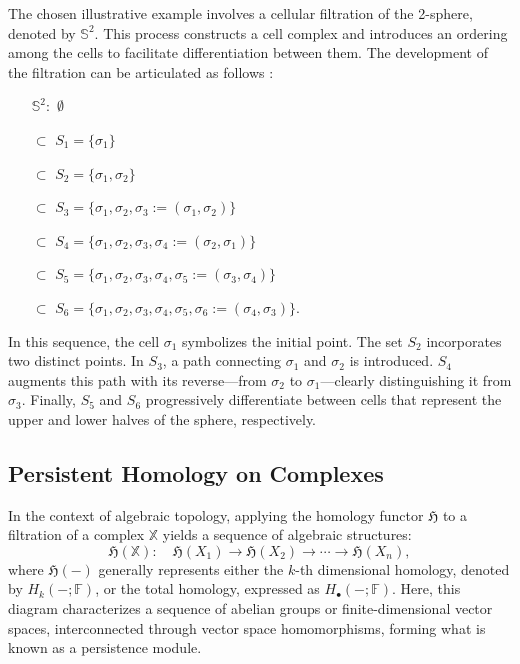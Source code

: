 \begin{example}
\label{filteredsphere}
The chosen illustrative example involves a cellular filtration of the 2-sphere, denoted by \( \mathbb{S}^2 \). This process constructs a cell complex and introduces an ordering among the cells to facilitate differentiation between them. The development of the filtration can be articulated as follows \cite[§2.2]{de2011dualities}:

\begin{itemize}
    \item[\( \mathbb{S}^2:\)] \( \emptyset \)
    \item[\( \subset \)] \( S_1 = \{\sigma_1\} \)
    \item[\( \subset \)] \( S_2 = \{\sigma_1, \sigma_2\} \)
    \item[\( \subset \)] \( S_3 = \{\sigma_1, \sigma_2, \sigma_3 := (\sigma_1, \sigma_2)\} \)
    \item[\( \subset \)] \( S_4 = \{\sigma_1, \sigma_2, \sigma_3, \sigma_4 := (\sigma_2, \sigma_1)\} \)
    \item[\( \subset \)] \( S_5 = \{\sigma_1, \sigma_2, \sigma_3, \sigma_4, \sigma_5 := (\sigma_3, \sigma_4)\} \)
    \item[\( \subset \)] \( S_6 = \{\sigma_1, \sigma_2, \sigma_3, \sigma_4, \sigma_5, \sigma_6 := (\sigma_4, \sigma_3)\}. \)
\end{itemize}

In this sequence, the cell \( \sigma_1 \) symbolizes the initial point. The set \( S_2 \) incorporates two distinct points. In \( S_3 \), a path connecting \( \sigma_1 \) and \( \sigma_2 \) is introduced. \( S_4 \) augments this path with its reverse—from \( \sigma_2 \) to \( \sigma_1 \)—clearly distinguishing it from \( \sigma_3 \). Finally, \( S_5 \) and \( S_6 \) progressively differentiate between cells that represent the upper and lower halves of the sphere, respectively.
\end{example}

\subsection{Persistent Homology on Complexes}
In the context of algebraic topology, applying the homology functor $\mathfrak{H}$ to a filtration of a complex $\mathbb{X}$ yields a sequence of algebraic structures:
\begin{equation}
\mathfrak{H}(\mathbb{X}): \quad \mathfrak{H}(X_1) \to \mathfrak{H}(X_2) \to \cdots \to \mathfrak{H}(X_n),
\end{equation}
where $\mathfrak{H}(-)$ generally represents either the $k$-th dimensional homology, denoted by $H_k(-;\mathbb{F})$, or the total homology, expressed as $H_\bullet(-;\mathbb{F})$. Here, this diagram characterizes a sequence of abelian groups or finite-dimensional vector spaces, interconnected through vector space homomorphisms, forming what is known as a persistence module.

